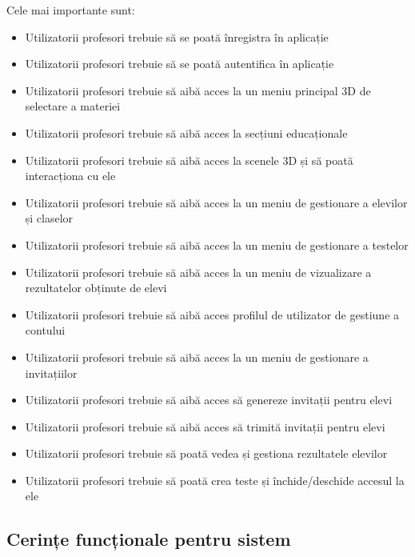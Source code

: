 Cele mai importante sunt:
\begin{itemize}
    \item Utilizatorii profesori trebuie să se poată înregistra în aplicație
    \item Utilizatorii profesori trebuie să se poată autentifica în aplicație
    \item Utilizatorii profesori trebuie să aibă acces la un meniu principal 3D de selectare a materiei
    \item Utilizatorii profesori trebuie să aibă acces la secțiuni educaționale
    \item Utilizatorii profesori trebuie să aibă acces la scenele 3D și să poată interacționa cu ele
    \item Utilizatorii profesori trebuie să aibă acces la un meniu de gestionare a elevilor și claselor
    \item Utilizatorii profesori trebuie să aibă acces la un meniu de gestionare a testelor
    \item Utilizatorii profesori trebuie să aibă acces la un meniu de vizualizare a rezultatelor obținute de elevi
    \item Utilizatorii profesori trebuie să aibă acces profilul de utilizator de gestiune a contului
    \item Utilizatorii profesori trebuie să aibă acces la un meniu de gestionare a invitațiilor
    \item Utilizatorii profesori trebuie să aibă acces să genereze invitații pentru elevi
    \item Utilizatorii profesori trebuie să aibă acces să trimită invitații pentru elevi
    \item Utilizatorii profesori trebuie să poată vedea și gestiona rezultatele elevilor
    \item Utilizatorii profesori trebuie să poată crea teste și închide/deschide accesul la ele
\end{itemize}

\subsection{Cerințe funcționale pentru sistem}
\label{sub-sec:proj-requirements-system}

